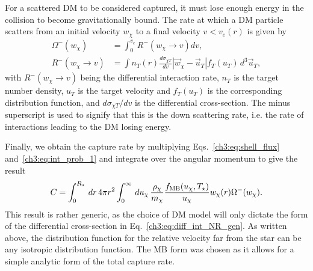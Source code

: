 For a scattered DM to be considered captured, it must lose enough energy in the collision to become gravitationally bound. The rate at which a DM particle scatters from an initial velocity $w_\chi$ to a final velocity $v<v_e(r)$ is given by~\cite{Gould:1987ju_WeaklyInteractingMassive, Gould:1987ir_ResonantEnhancementsWIMP, Busoni:2017mhe_oct_Evaporationscatteringmomentum}
\begin{align}
    \Omega^{-}(w_\chi) &= \int_0^{v_e} R^-(w_\chi \rightarrow v) dv,\label{ch3:eq:down_rate_1}\\
    R^-(w_\chi \rightarrow v) & = \int n_T(r) \frac{d\sigma_{\chi T}}{dv} |\vec{w}_\chi -\vec{u}_T| f_T(u_T) \,d^3\vec{u}_T, \label{ch3:eq:diff_int_NR_gen}
\end{align}
with $R^-(w_\chi \rightarrow v)$ being the differential interaction rate, $n_T$ is the target number density, $u_T$ is the target velocity and $f_T(u_T)$ is the corresponding distribution function, and $d\sigma_{\chi T}/dv$ is the differential cross-section. The minus superscript is used to signify that this is the down scattering rate, i.e. the rate of interactions leading to the DM losing energy. 

Finally, we obtain the capture rate by multiplying Eqs.~\ref{ch3:eq:shell_flux} and~\ref{ch3:eq:int_prob_1} and integrate over the angular momentum to give the result
\begin{equation}
    C =\int_0^{R_\star} \,dr\, 4\pi r^2 \int_0^\infty\,du_\chi\, \frac{\rho_\chi}{m_\chi} \frac{f_{\rm MB}(u_\chi, T_\star)}{u_\chi} w_\chi(r)\Omega^-(w_\chi).
\end{equation}
This result is rather generic, as the choice of DM model will only dictate the form of the differential cross-section in  Eq.~\ref{ch3:eq:diff_int_NR_gen}. As written above, the distribution function for the relative velocity far from the star can be any isotropic distribution function. The MB form was chosen as it allows for a simple analytic form of the total capture rate. 

